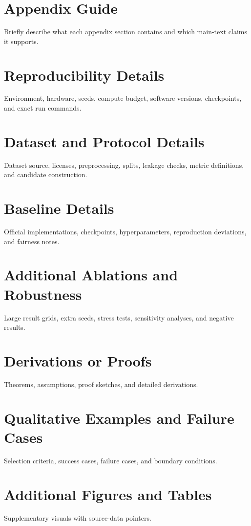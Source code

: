 \appendix

\section{Appendix Guide}
Briefly describe what each appendix section contains and which main-text claims it supports.

\section{Reproducibility Details}
Environment, hardware, seeds, compute budget, software versions, checkpoints, and exact run commands.

\section{Dataset and Protocol Details}
Dataset source, licenses, preprocessing, splits, leakage checks, metric definitions, and candidate construction.

\section{Baseline Details}
Official implementations, checkpoints, hyperparameters, reproduction deviations, and fairness notes.

\section{Additional Ablations and Robustness}
Large result grids, extra seeds, stress tests, sensitivity analyses, and negative results.

\section{Derivations or Proofs}
Theorems, assumptions, proof sketches, and detailed derivations.

\section{Qualitative Examples and Failure Cases}
Selection criteria, success cases, failure cases, and boundary conditions.

\section{Additional Figures and Tables}
Supplementary visuals with source-data pointers.
